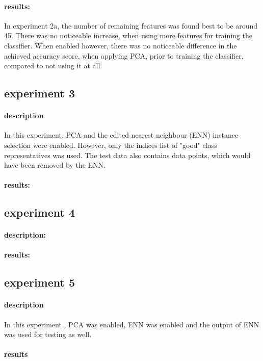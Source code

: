 \documentclass[10pt,a4paper]{proc}
\begin{document}
\paragraph{results:} In experiment 2a, the number of remaining features was found best to be around 45. There was no noticeable increase, when using more features for training the classifier. When enabled however, there was no noticeable difference in the achieved accuracy score, when applying PCA, prior to training the classifier, compared to not using it at all.

\FloatBarrier
\subsection{experiment 3}\label{exp3}
\paragraph{description}
In this experiment, PCA and the edited nearest neighbour (ENN) instance selection were enabled. However, only the indices list of "good" class representatives was used. The test data also contains data points, which would have been removed by the ENN.
\paragraph{results:}

\FloatBarrier
\subsection{experiment 4}\label{exp4}
\paragraph{description:}
\paragraph{results:}

\FloatBarrier
\subsection{experiment 5}\label{exp5}
\paragraph{description}
In this experiment , PCA was enabled, ENN was enabled and the output of ENN was used for testing as well.
\paragraph{results}

\twocolumn
\end{document}
